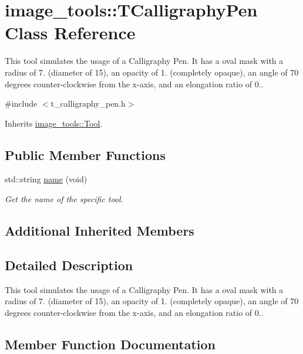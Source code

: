 \hypertarget{classimage__tools_1_1TCalligraphyPen}{}\section{image\+\_\+tools\+:\+:T\+Calligraphy\+Pen Class Reference}
\label{classimage__tools_1_1TCalligraphyPen}


This tool simulates the usage of a Calligraphy Pen. It has a oval mask with a radius of 7. (diameter of 15), an opacity of 1. (completely opaque), an angle of 70 degrees counter-\/clockwise from the x-\/axis, and an elongation ratio of 0..  




{\ttfamily \#include $<$t\+\_\+calligraphy\+\_\+pen.\+h$>$}



Inherits \hyperlink{classimage__tools_1_1Tool}{image\+\_\+tools\+::\+Tool}.

\subsection*{Public Member Functions}
\begin{DoxyCompactItemize}
\item 
std\+::string \hyperlink{classimage__tools_1_1TCalligraphyPen_adcc77e8eaf9fbd8d03eeba73f6f51f7b}{name} (void)
\begin{DoxyCompactList}\small\item\em Get the name of the specific tool. \end{DoxyCompactList}\end{DoxyCompactItemize}
\subsection*{Additional Inherited Members}


\subsection{Detailed Description}
This tool simulates the usage of a Calligraphy Pen. It has a oval mask with a radius of 7. (diameter of 15), an opacity of 1. (completely opaque), an angle of 70 degrees counter-\/clockwise from the x-\/axis, and an elongation ratio of 0.. 

\subsection{Member Function Documentation}

